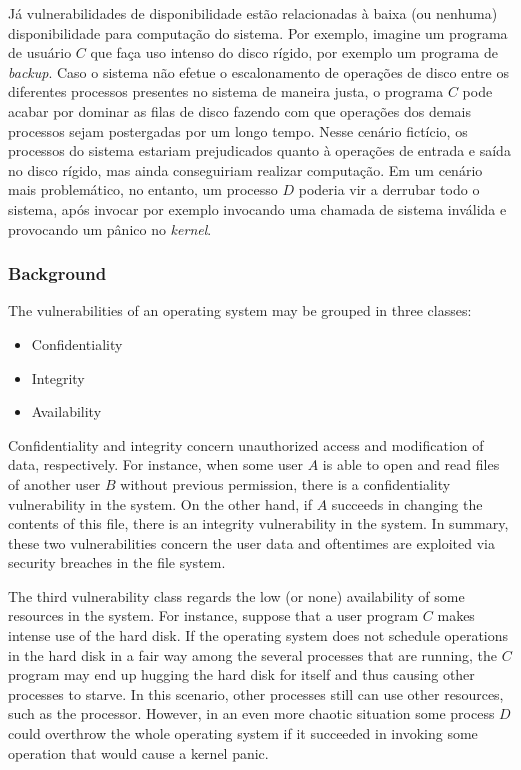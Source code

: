 \documentclass[11pt]{article}
\newif\ifen
\begin{document}
Já vulnerabilidades de disponibilidade estão relacionadas à baixa (ou
nenhuma) disponibilidade para computação do sistema. Por exemplo,
imagine um programa de usuário $C$ que faça uso intenso do disco rígido,
por exemplo um programa de \textit{backup}. Caso o sistema não efetue o
escalonamento de operações de disco entre os diferentes processos
presentes no sistema de maneira justa, o programa $C$ pode acabar por
dominar as filas de disco fazendo com que operações dos demais processos
sejam postergadas por um longo tempo. Nesse cenário fictício, os
processos do sistema estariam prejudicados quanto à operações de entrada
e saída no disco rígido, mas ainda conseguiriam realizar computação. Em
um cenário mais problemático, no entanto, um processo $D$ poderia vir a
derrubar todo o sistema, após invocar por exemplo invocando uma chamada
de sistema inválida e provocando um pânico no \textit{kernel}.

\else\ifen
\subsubsection*{Background}

The vulnerabilities of an operating system may be grouped in three
classes:

\begin{itemize}
	\item Confidentiality
	\item Integrity
	\item Availability
\end{itemize}

Confidentiality and integrity concern unauthorized access and
modification of data, respectively. For instance, when some user $A$
is able to open and read files of another user $B$ without previous
permission, there is a confidentiality vulnerability in the system. On
the other hand, if $A$ succeeds in changing the contents of this file,
there is an integrity vulnerability in the system. In summary, these two
vulnerabilities concern the user data and oftentimes are exploited via
security breaches in the file system.

The third vulnerability class regards the low (or none) availability of
some resources in the system. For instance, suppose that a user program
$C$ makes intense use of the hard disk. If the operating system does not
schedule operations in the hard disk in a fair way among the several
processes that are running, the $C$ program may end up hugging the hard
disk for itself and thus causing other processes to starve. In this
scenario, other processes still can use other resources, such as the
processor. However, in an even more chaotic situation some process $D$
could overthrow the whole operating system if it succeeded in invoking
some operation that would cause a kernel panic.
\end{document}
